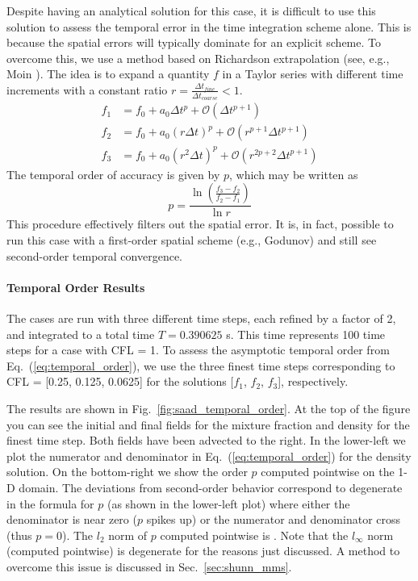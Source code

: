 \documentclass[11pt]{book}
\begin{document}
Despite having an analytical solution for this case, it is difficult to use this solution to assess the temporal error in the time integration scheme alone.  This is because the spatial errors will typically dominate for an explicit scheme.  To overcome this, we use a method based on Richardson extrapolation (see, e.g., Moin \cite{Moin:2001}).  The idea is to expand a quantity $f$ in a Taylor series with different time increments with a constant ratio $r = \frac{\Delta t_{fine}}{\Delta t_{coarse}} < 1$.
\begin{align}
f_1 &= f_0 + a_0 \Delta t^p + \mathcal{O}(\Delta t^{p+1}) \\
f_2 &= f_0 + a_0 (r \Delta t)^p + \mathcal{O}(r^{p+1} \Delta t^{p+1}) \\
f_3 &= f_0 + a_0 (r^2 \Delta t)^p + \mathcal{O}(r^{2p+2} \Delta t^{p+1})
\end{align}
The temporal order of accuracy is given by $p$, which may be written as
\begin{equation}
\label{eq:temporal_order}
p = \frac{\ln \left(\frac{f_3-f_2}{f_2-f_1}\right)}{\ln r}
\end{equation}
This procedure effectively filters out the spatial error.  It is, in fact, possible to run this case with a first-order spatial scheme (e.g., Godunov) and still see second-order temporal convergence.

\paragraph{Temporal Order Results} The  cases are run with three different time steps, each refined by a factor of 2, and integrated to a total time $T=0.390625$ s.  This time represents 100 time steps for a case with CFL = 1.  To assess the asymptotic temporal order from Eq.~(\ref{eq:temporal_order}), we use the three finest time steps corresponding to CFL = [0.25, 0.125, 0.0625] for the solutions [$f_1$, $f_2$, $f_3$], respectively.

The results are shown in Fig.~\ref{fig:saad_temporal_order}.  At the top of the figure you can see the initial and final fields for the mixture fraction and density for the finest time step.  Both fields have been advected to the right.  In the lower-left we plot the numerator and denominator in Eq.~(\ref{eq:temporal_order}) for the density solution.  On the bottom-right we show the order $p$ computed pointwise on the 1-D domain. The deviations from second-order behavior correspond to degenerate in the formula for $p$ (as shown in the lower-left plot) where either the denominator is near zero ($p$ spikes up) or the numerator and denominator cross (thus $p=0$).  The $l_2$ norm of $p$ computed pointwise is \!.  Note that the $l_\infty$ norm (computed pointwise) is degenerate for the reasons just discussed.  A method to overcome this issue is discussed in Sec.~\ref{sec:shunn_mms}.
\end{document}
